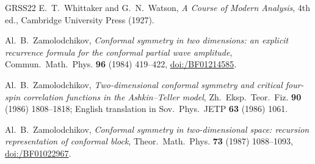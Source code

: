 \documentclass[twoside,10pt]{article}
\numberwithin{equation}{section}
\theoremstyle{slbody}
\theoremstyle{definition}
\theoremstyle{remark}
\begin{document}
{\begin{thebibliography}{GRSS22}
E.~T.~Whittaker and G.~N.~Watson,
\emph{A Course of Modern Analysis}, 4th ed.,
Cambridge University Press (1927).

Al.~B.~Zamolodchikov,
\emph{Conformal symmetry in two dimensions: an explicit recurrence
formula for the conformal partial wave amplitude},
Commun.\ Math.\ Phys. \textbf{96} (1984) 419--422,
\href{https://doi.org/10.1007/BF01214585}{doi:/BF01214585}.

Al.~B.~Zamolodchikov,
\emph{Two-dimensional conformal symmetry and critical four-spin correlation
functions in the Ashkin--Teller model},
Zh.\ Eksp.\ Teor.\ Fiz. \textbf{90} (1986) 1808--1818; English translation
in Sov.\ Phys.\ JETP \textbf{63} (1986) 1061.

Al.~B.~Zamolodchikov,
\emph{Conformal symmetry in two-dimensional space: recursion
representation of conformal block},
Theor.\ Math.\ Phys. \textbf{73} (1987) 1088--1093,
\href{https://doi.org/10.1007/BF01022967}{doi:/BF01022967}.

\end{thebibliography}
}
\end{document}
